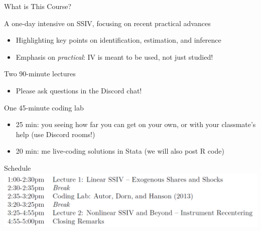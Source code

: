 \documentclass[t]{beamer}
\begin{document}
\begin{frame}{What is This Course?}

A one-day intensive on SSIV, focusing on recent practical advances

\begin{itemize}
  \item Highlighting key points on identification, estimation, and inference
  \item Emphasis on \emph{practical}: IV is meant to be used, not just studied!
\end{itemize}\pause\medskip

Two 90-minute lectures

\begin{itemize}
  \item Please ask questions in the Discord chat!
\end{itemize}\pause\medskip

One 45-minute coding lab
\begin{itemize}
  \item 25 min: you seeing how far you can get on your own, or with your classmate's help (use Discord rooms!)
  \item 20 min: me live-coding solutions in Stata (we will also post R code)
\end{itemize}

\end{frame}

\begin{frame}{Schedule}
\vspace*{\fill}
\includegraphics[scale=0.52]{./lecture_includes/schedule.png}
\vspace*{\fill}
\end{frame}
\end{document}
